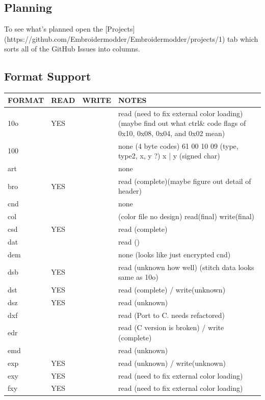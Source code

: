 \documentclass[a4paper, 11pt]{report}
\begin{document}
\subsection{Planning}

To see what's planned open the [Projects](https://github.com/Embroidermodder/Embroidermodder/projects/1) tab which sorts all of the GitHub Issues into columns.

\subsection{Format Support}

\begin{longtable}{l l l p{8cm}}
FORMAT & READ & WRITE & NOTES \\
\hline
10o    & YES   &       & read (need to fix external color loading) (maybe find out what ctrl\& code flags of 0x10, 0x08, 0x04, and 0x02 mean) \\
100    &       &       & none (4 byte codes) 61 00 10 09 (type, type2, x, y ?) x | y (signed char) \\
art    &       &       & none \\
bro    & YES   &       & read (complete)(maybe figure out detail of header) \\
cnd    &       &       & none \\
col    &       &       & (color file no design) read(final) write(final) \\
csd    & YES   &       & read (complete) \\
dat    &       &       & read () \\
dem    &       &       & none (looks like just encrypted cnd) \\
dsb    & YES   &       & read (unknown how well) (stitch data looks same as 10o) \\
dst    & YES   &       & read (complete) / write(unknown) \\
dsz    & YES   &       & read (unknown) \\
dxf    &       &       & read (Port to C. needs refactored) \\
edr    &       &       & read (C version is broken) / write (complete) \\
emd    &       &       & read (unknown) \\
exp    & YES   &       & read (unknown) / write(unknown) \\
exy    & YES   &       & read (need to fix external color loading) \\
fxy    & YES   &       & read (need to fix external color loading) \\

\end{longtable}
\end{document}
